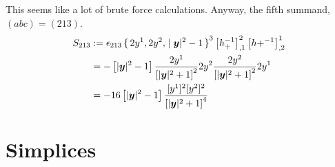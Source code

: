 \documentclass[11pt, english, fleqn, DIV=15, headinclude, BCOR=1cm]{scrartcl}
\begin{document}
This seems like a lot of brute force calculations. Anyway, the fifth summand,
$(abc) = (213)$.
\begin{align*}
    S_{213}
    &:= \epsilon_{213} \set{2 y^1, 2y^2, |\boldsymbol{y}|^2 -1}^3
    \left[ h_+^{-1} \right]^{2}_{,1}
    \left[ h+^{-1} \right]^{1}_{,2} \\
    &= - \left[ |\boldsymbol{y}|^2 -1 \right]
    \frac{2 y^1}{\left[ |\boldsymbol{y}|^2 + 1 \right]^2} 2y^2
    \frac{2 y^2}{\left[ |\boldsymbol{y}|^2 + 1 \right]^2} 2y^1 \\
    &= - 16 \left[ |\boldsymbol{y}|^2 -1 \right]
    \frac{[y^1]^2 [y^2]^2}{\left[ |\boldsymbol{y}|^2 + 1 \right]^4}
\end{align*}

\section{Simplices}
\label{homework:3}
\end{document}
